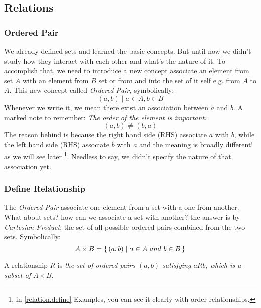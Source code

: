 \subsection{Relations}

\subsubsection{Ordered Pair}
We already defined sets and learned the basic concepts. But until now we didn't study how they interact with each other and what's the nature of it. To accomplish that, we need to introduce a new concept associate an element from set $A$ with an element from $B$ set or from and into the set of it self e.g. from $A$ to $A$.
This new concept called {\it Ordered Pair}, symbolically:
$$
    (a,b) \mid a \in A, b \in B
$$
Whenever we write it, we mean there exist an association between $a$ and $b$. A marked note to remember: {\it The order of the element is important:
$$
    (a,b) \neq (b,a)
$$
} The reason behind is because the right hand side (RHS) associate $a$ with $b$, while the left hand side (RHS) associate $b$ with $a$ and the meaning is broadly different! as we will see later \footnote{in \ref{relation.define} Examples, you can see it clearly with order relationships.}. Needless to say, we didn't specify the nature of that association yet.
\subsubsection{Define Relationship \label{relation.define}}
The {\it Ordered Pair} associate one element from a set with a one from another. What about sets? how can we associate a set with another? the answer is by {\it Cartesian Product}: the set of all possible ordered pairs combined from the two sets. Symbolically:
$$
A \times B = \set{(a,b) \mid a \in A \ and \  b \in B}
$$

A relationship $R$ is {\it the set of ordered pairs $(a,b)$ satisfying $aRb$, which is a subset of $A \times B$}. 
